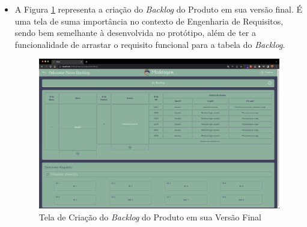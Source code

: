 \begin{itemize}
    \item A Figura \ref{fig:backlog_implementado} representa a criação do \textit{Backlog} do Produto em sua versão final. É uma tela de suma importância no contexto de Engenharia de Requisitos, sendo bem semelhante à desenvolvida no protótipo, além de ter a funcionalidade de arrastar o requisito funcional para a tabela do \textit{Backlog}.
    \begin{figure}[]
      \begin{center}
          \caption{{Tela de Criação do \textit{Backlog} do Produto em sua Versão Final}}
          \label{fig:backlog_implementado}
          \includegraphics[scale=0.2]{figuras/TelasDesenvolvidas/backlog-implementado.png}
    \end{center}
    \end{figure}


\end{itemize}
